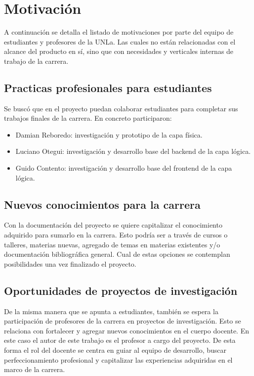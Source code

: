 
\section{Motivación}
A continuación se detalla el listado de motivaciones por parte del equipo de estudiantes y profesores de la UNLa. Las cuales no están relacionadas con el alcance del producto en sí, sino que con necesidades y verticales internas de trabajo de la carrera. 

\subsection{Practicas profesionales para estudiantes}
Se buscó que en el proyecto puedan colaborar estudiantes para completar sus trabajos finales de la carrera. En concreto participaron:
\begin{itemize}
\item Damian Reboredo: investigación y prototipo de la capa física.
\item Luciano Otegui: investigación y desarrollo base del backend de la capa lógica.
\item Guido Contento: investigación y desarrollo base del frontend de la capa lógica.
\end{itemize}

\subsection{Nuevos conocimientos para la carrera}
Con la documentación del proyecto se quiere capitalizar el conocimiento adquirido para sumarlo en la carrera. Esto podría ser a través de cursos o talleres, materias nuevas, agregado de temas en materias existentes y/o documentación bibliográfica general. Cual de estas opciones se contemplan posibilidades una vez finalizado el proyecto.

\subsection{Oportunidades de proyectos de investigación}
De la misma manera que se apunta a estudiantes, también se espera la participación de profesores de la carrera en proyectos de investigación. Esto se relaciona con fortalecer y agregar nuevos conocimientos en el cuerpo docente. En este caso el autor de este trabajo es el profesor a cargo del proyecto. De esta forma el rol del docente se centra en guiar al equipo de desarrollo, buscar perfeccionamiento profesional y capitalizar las experiencias adquiridas en el marco de la carrera.

